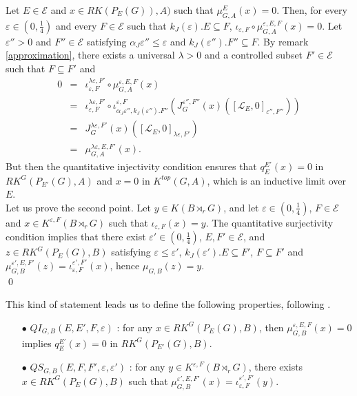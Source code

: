 \begin{dem}
Let $E\in\mathcal E$ and $x\in RK(P_E(G)),A)$ such that $\mu_{G,A}^E(x)=0$. Then, for every $\varepsilon\in (0,\frac{1}{4})$ and every $F\in\mathcal E$ such that $k_J(\varepsilon).E\subseteq F$, $\iota_{\varepsilon,F}\circ\mu_{G,A}^{\varepsilon,E,F}(x)=0$. Let $\varepsilon''>0$ and $F''\in\mathcal E$ satisfying $\alpha_J\varepsilon''\leq \varepsilon$ and $k_J(\varepsilon''). F''\subseteq F$. By remark \ref{approximation}, there exists a universal $\lambda>0$ and a controlled subset $F'\in\mathcal E$ such that $F\subseteq F'$ and
\[\begin{array}{lll}0 &  =  & \iota_{\varepsilon,F}^{\lambda\varepsilon,F'}\circ \mu_{G,A}^{\varepsilon,E,F}(x) \\
			& = & \iota_{\varepsilon,F}^{\lambda\varepsilon,F'}\circ \iota^{\varepsilon,F}_{\alpha_J\varepsilon'',k_J(\varepsilon'').F''} (J_{G}^{\varepsilon'',F''}(x)([\mathcal L_E,0]_{\varepsilon'',F''})) \\
			& = & J_{G}^{\lambda\varepsilon,F'}(x)([\mathcal L_E,0]_{\lambda\varepsilon,F'}) \\
			& = & \mu_{G,A}^{\lambda\varepsilon,E,F'}(x).
\end{array}\]
But then the quantitative injectivity condition ensures that $q_E^{E'}(x)=0$ in $RK^G(P_{E'}(G),A)$ and $x=0$ in $K^{top}(G,A)$, which is an inductive limit over $E$.\\

Let us prove the second point. Let $y\in K(B\rtimes_r G)$, and let $\varepsilon\in (0,\frac{1}{4})$, $F\in\mathcal E$ and $x\in K^{\varepsilon,F}(B\rtimes_r G)$ such that $\iota_{\varepsilon,F}(x) =y$. The quantitative surjectivity condition implies that there exist $\varepsilon'\in (0,\frac{1}{4})$, $E,F'\in\mathcal E$, and $z\in RK^G(P_E(G),B)$ satisfying $\varepsilon\leq \varepsilon'$, $k_J(\varepsilon').E\subseteq F'$, $F\subseteq F'$ and $\mu_{G,B}^{\varepsilon',E,F'}(z) = \iota_{\varepsilon,F}^{\varepsilon',F'} (x)$, hence $\mu_{G,B}(z) =y$.\\
\qed
\end{dem}

This kind of statement leads us to define the following properties, following \cite{OY3}.\\
\begin{itemize}
\item[$\bullet$] $QI_{G,B}(E,E',F,\varepsilon)$ : for any $x\in RK^G(P_E(G), B )$, then $\mu^{\varepsilon,E,F}_{G,B}(x) = 0$ implies $q_E^{E'}(x)=0$ in $RK^G(P_{E'}(G),B)$.
\item[$\bullet$] $QS_{G,B}(E,F,F',\varepsilon,\varepsilon')$ : for any $y\in K^{\varepsilon,F}(B\rtimes_r G)$, there exists $x\in RK^G(P_E(G),B)$ such that $\mu^{\varepsilon',E,F'}_{G,B}(x)=\iota_{\varepsilon,F}^{\varepsilon',F'}(y)$.\\
\end{itemize} 

